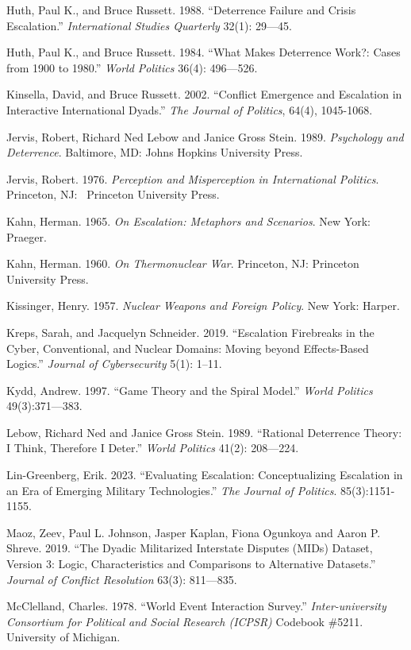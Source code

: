 \documentclass[
]{article}
\begin{document}
Huth, Paul K., and Bruce Russett. 1988. ``Deterrence Failure and Crisis
Escalation.'' \emph{International Studies Quarterly} 32(1): 29---45.

Huth, Paul K., and Bruce Russett. 1984. ``What Makes Deterrence Work?:
Cases from 1900 to 1980.'' \emph{World Politics} 36(4): 496---526.

Kinsella, David, and Bruce Russett. 2002. ``Conflict Emergence and
Escalation in Interactive International Dyads.'' \emph{The Journal of
Politics}, 64(4), 1045-1068.

Jervis, Robert, Richard Ned Lebow and Janice Gross Stein. 1989.
\emph{Psychology and Deterrence}. Baltimore, MD: Johns Hopkins
University Press.

Jervis, Robert. 1976. \emph{Perception and Misperception in
International Politics}. Princeton, NJ:~ Princeton University Press.

Kahn, Herman. 1965. \emph{On Escalation: Metaphors and Scenarios}. New
York: Praeger.

Kahn, Herman. 1960. \emph{On Thermonuclear War}. Princeton, NJ:
Princeton University Press.

Kissinger, Henry. 1957. \emph{Nuclear Weapons and Foreign Policy}. New
York: Harper.

Kreps, Sarah, and Jacquelyn Schneider. 2019. ``Escalation Firebreaks in
the Cyber, Conventional, and Nuclear Domains: Moving beyond
Effects-Based Logics.'' \emph{Journal of Cybersecurity} 5(1): 1--11.

Kydd, Andrew. 1997. ``Game Theory and the Spiral Model.'' \emph{World
Politics} 49(3):371---383.

Lebow, Richard Ned and Janice Gross Stein. 1989. ``Rational Deterrence
Theory: I Think, Therefore I Deter.'' \emph{World Politics} 41(2):
208---224.

Lin-Greenberg, Erik. 2023. ``Evaluating Escalation: Conceptualizing
Escalation in an Era of Emerging Military Technologies.'' \emph{The
Journal of Politics}. 85(3):1151-1155.

Maoz, Zeev, Paul L. Johnson, Jasper Kaplan, Fiona Ogunkoya and Aaron P.
Shreve. 2019. ``The Dyadic Militarized Interstate Disputes (MIDs)
Dataset, Version 3: Logic, Characteristics and Comparisons to
Alternative Datasets.'' \emph{Journal of Conflict Resolution} 63(3):
811---835.~

McClelland, Charles. 1978. ``World Event Interaction Survey.''
\emph{Inter-university Consortium for Political and Social Research
(ICPSR)} Codebook \#5211. University of Michigan.
\end{document}
